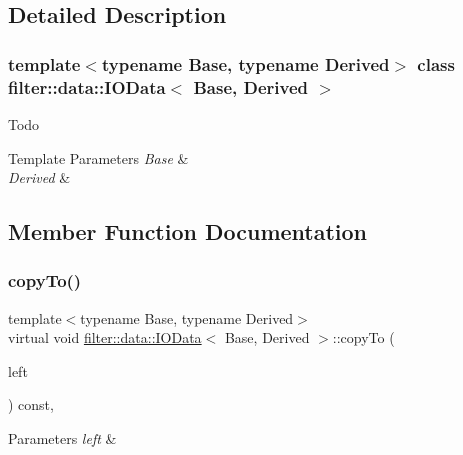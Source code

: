 \subsection{Detailed Description}
\subsubsection*{template$<$typename Base, typename Derived$>$\newline
class filter\+::data\+::\+I\+O\+Data$<$ Base, Derived $>$}

\begin{DoxyRefDesc}{Todo}
\item[\hyperlink{todo__todo000024}{Todo}]\end{DoxyRefDesc}

\begin{DoxyTemplParams}{Template Parameters}
{\em Base} & \\
\hline
{\em Derived} & \\
\hline
\end{DoxyTemplParams}


\subsection{Member Function Documentation}
\mbox{\label{classfilter_1_1data_1_1_i_o_data_a6ad82e2b326a0f436391225daa728458}} 
\subsubsection{\texorpdfstring{copy\+To()}{copyTo()}}
{\footnotesize\ttfamily template$<$typename Base, typename Derived$>$ \\
virtual void \hyperlink{classfilter_1_1data_1_1_i_o_data}{filter\+::data\+::\+I\+O\+Data}$<$ Base, Derived $>$\+::copy\+To (\begin{DoxyParamCaption}\item[{\hyperlink{classfilter_1_1data_1_1_i_o_data}{I\+O\+Data}$<$ Base, Derived $>$ \&}]{left }\end{DoxyParamCaption}) const\hspace{0.3cm}{\ttfamily [inline]}, {\ttfamily [virtual]}}


\begin{DoxyParams}{Parameters}
{\em left} & \\
\hline
\end{DoxyParams}


